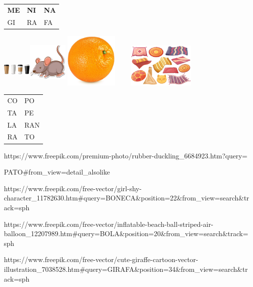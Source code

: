 \begin{longtable}[]{@{}lll@{}}
\toprule
\textbf{ME} & \textbf{NI} & \textbf{NA}\tabularnewline
GI & RA & FA\tabularnewline
\bottomrule
\end{longtable}

\includegraphics[width=0.55139in,height=0.68958in]{media/image22.png}\includegraphics[width=0.75833in,height=0.98819in]{media/image23.png}\includegraphics[width=1.09306in,height=1.05139in]{media/image24.png}\includegraphics[width=1.89097in,height=0.84583in]{media/image25.png}

\begin{longtable}[]{@{}ll@{}}
\toprule
CO & PO\tabularnewline
TA & PE\tabularnewline
LA & RAN\tabularnewline
RA & TO\tabularnewline
\bottomrule
\end{longtable}

https://www.freepik.com/premium-photo/rubber-duckling\_6684923.htm?query=

PATO\#from\_view=detail\_alsolike

https://www.freepik.com/free-vector/girl-shy-character\_11782630.htm\#query=BONECA\&position=22\&from\_view=search\&track=sph

https://www.freepik.com/free-vector/inflatable-beach-ball-striped-air-balloon\_12207989.htm\#query=BOLA\&position=20\&from\_view=search\&track=sph

https://www.freepik.com/free-vector/cute-giraffe-cartoon-vector-illustration\_7038528.htm\#query=GIRAFA\&position=34\&from\_view=search\&track=sph

